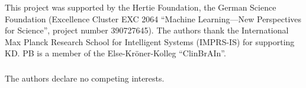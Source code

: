 \documentclass[runningheads]{llncs}
\begin{document}
    

    \begin{credits}
    \subsubsection{\ackname} This project was supported by the Hertie Foundation, the German Science Foundation (Excellence Cluster EXC 2064 ``Machine Learning—New Perspectives for Science'', project number 390727645). The authors thank the International Max Planck Research School for Intelligent Systems (IMPRS-IS) for supporting KD. PB is a member of the Else-Kröner-Kolleg ``ClinBrAIn''.

    \subsubsection{\discintname}
        The authors declare no competing interests.
    \end{credits}

    



\end{document}
